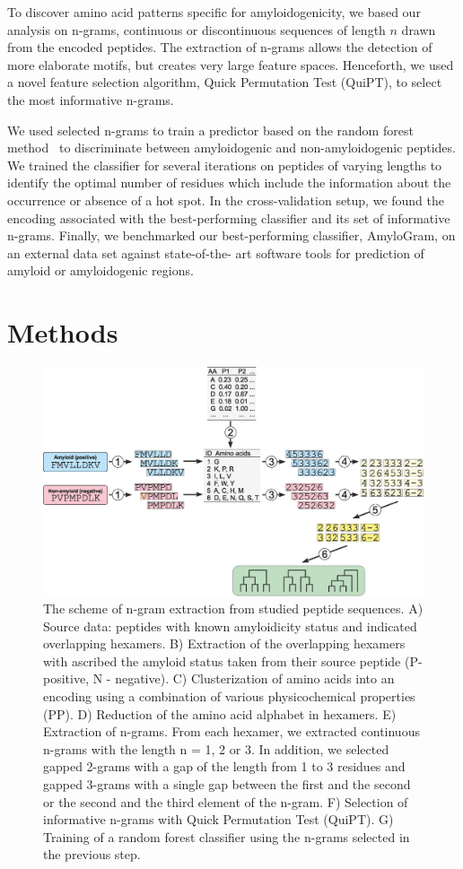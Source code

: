 \documentclass[fleqn,10pt,twoside]{gcb15submission}
\begin{document}
  To discover amino acid patterns specific for amyloidogenicity, we based our 
analysis on n-grams, continuous or discontinuous sequences of length $n$ drawn 
from the encoded peptides. The extraction of n-grams allows the detection of 
more elaborate motifs, but creates very large feature spaces. Henceforth, we 
used a novel feature selection algorithm, Quick Permutation Test (QuiPT), to 
select the most informative n-grams.

  We used selected n-grams to train a predictor based on the random forest 
method~\citep{breiman_random_2001} to discriminate between amyloidogenic and 
non-amyloidogenic peptides. We trained the classifier for several iterations on 
peptides of varying lengths to identify the optimal number of residues which 
include the information about the occurrence or absence of a hot spot. In the 
cross-validation setup, we found the encoding associated with the 
best-performing classifier and its set of informative n-grams. Finally, we 
benchmarked our best-performing classifier, AmyloGram, on an external data set 
against state-of-the- art software tools for prediction of amyloid or 
amyloidogenic regions.

\section{Methods}

\begin{figure}[bth]
\centerline{\includegraphics[width=0.7\linewidth]{figures/fig2.eps}} 
\caption{The scheme of n-gram extraction from studied peptide sequences. 
A) Source data: peptides with known amyloidicity status and indicated 
overlapping hexamers. 
B) Extraction of the overlapping hexamers with ascribed the 
amyloid status taken from their source peptide (P-positive, N - 
negative). 
C) Clusterization of amino acids into an encoding using a combination of 
various 
physicochemical properties (PP). 
D) Reduction of the amino acid alphabet in hexamers. 
E) Extraction of n-grams. From each hexamer, we extracted continuous n-grams 
with the length n = 1, 2 or 3. In addition, we selected gapped 2-grams with a 
gap of the length from 1 to 3 residues and gapped 3-grams with a single gap 
between the first and the second or the second and the third element of the 
n-gram.
F) Selection of informative n-grams with Quick Permutation Test (QuiPT).
G) Training of a random forest classifier using the n-grams selected in the 
previous 
step.}\label{fig:ngram_scheme} 
\end{figure}
\end{document}
